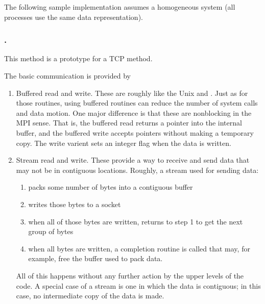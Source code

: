 
The following sample implementation assumes a homogeneous system (all
processes use the same data representation).  

\subsubsection{\tcpname.}
This method is a prototype for a TCP method.  

The basic communication is provided by
\begin{enumerate}
\item Buffered read and write.  These are roughly like the Unix 
  and .  Just as for those routines, using buffered routines can
  reduce the number of system calls and data motion.  One major difference is
  that these are nonblocking in the MPI sense.  That is, the buffered read
  returns a pointer into the internal buffer, and the buffered write accepts
  pointers without making a temporary copy.  The write varient sets an integer
  flag when the data is written.

\item Stream read and write.  These provide a way to receive and send data that
  may not be in contiguous locations.  Roughly, a stream used for
  sending data:
    \begin{enumerate}
    \item packs some number of bytes into a contiguous buffer
    \item writes those bytes to a socket
    \item when all of those bytes are written, returns to step 1 to
    get the next group of bytes
    \item when all bytes are written, a completion routine is called
    that may, for example, free the buffer used to pack data.
    \end{enumerate}

    All of this happens without any further action by the upper levels
    of the code.  A special case of a stream is one in which the data
    is contiguous; in this case, no intermediate copy of the data is
    made.


\end{enumerate}
